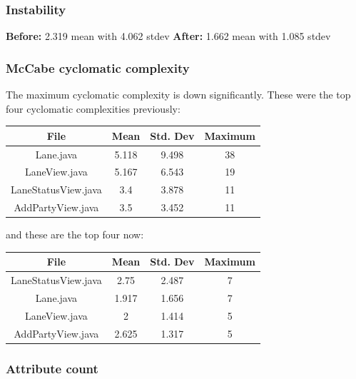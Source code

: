 \subsubsection{Instability}

\textbf{Before:} 2.319 mean with 4.062 stdev
\textbf{After:} 1.662 mean with 1.085 stdev


\subsubsection{McCabe cyclomatic complexity}

The maximum cyclomatic complexity is down significantly. These were the top four cyclomatic complexities previously:

\begin{tabular}{ |c|c|c|c| }
    \hline
    \textbf{File}       & \textbf{Mean} & \textbf{Std. Dev} & \textbf{Maximum} \\
    \hline
    Lane.java           & 5.118         & 9.498             & 38               \\
    LaneView.java       & 5.167         & 6.543             & 19               \\
    LaneStatusView.java & 3.4           & 3.878             & 11               \\
    AddPartyView.java   & 3.5           & 3.452             & 11               \\
    \hline
\end{tabular}

and these are the top four now:

\begin{tabular}{ |c|c|c|c| }
    \hline
    \textbf{File}       & \textbf{Mean} & \textbf{Std. Dev} & \textbf{Maximum} \\
    \hline
    LaneStatusView.java & 2.75          & 2.487             & 7                \\
    Lane.java           & 1.917         & 1.656             & 7                \\
    LaneView.java       & 2             & 1.414             & 5                \\
    AddPartyView.java   & 2.625         & 1.317             & 5                \\
    \hline
\end{tabular}


\subsubsection{Attribute count}

